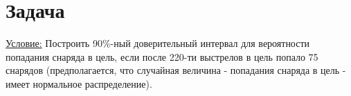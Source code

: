 \documentclass[a4paper,12pt]{article} %
\begin{document}
\section{Задача}
\underline{Условие:} Построить 90\%-ный доверительный интервал для вероятности
попадания снаряда в цель, если после 220-ти выстрелов в цель попало 75 снарядов
(предполагается, что случайная величина - попадания снаряда в цель - имеет
нормальное распределение).
\end{document}
